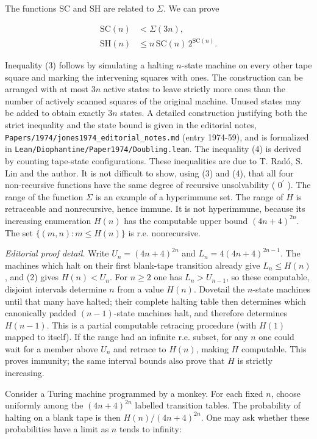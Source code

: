 \documentclass[11pt]{article}
\newcommand{\SH}{\mathrm{SH}}
\newcommand{\SC}{\mathrm{SC}}
\begin{document}
The functions $\SC$ and $\SH$ are related to $\Sigma$. We can prove

\begin{align}
\SC(n)&<\Sigma(3n), \tag{3}\\
\SH(n)&\leq n\,\SC(n)\,2^{\SC(n)}. \tag{4}
\end{align}

Inequality (3) follows by simulating a halting $n$-state machine on every other tape square and marking the intervening squares with ones. The construction can be arranged with at most $3n$ active states to leave strictly more ones than the number of actively scanned squares of the original machine. Unused states may be added to obtain exactly $3n$ states. A detailed construction justifying both the strict inequality and the state bound is given in the editorial notes, \texttt{Papers/1974/}\allowbreak\texttt{jones1974\_editorial\_notes.md} (entry 1974-59), and is formalized in \texttt{Lean/Diophantine/Paper1974/}\allowbreak\texttt{Doubling.lean}. The inequality (4) is derived by counting tape-state configurations. These inequalities are due to T. Radó, S. Lin and the author. It is not difficult to show, using (3) and (4), that all four non-recursive functions have the same degree of recursive unsolvability ( $0^{\prime}$ ). The range of the function $\Sigma$ is an example of a hyperimmune set. The range of $H$ is retraceable and nonrecursive, hence immune. It is not hyperimmune, because its increasing enumeration $H(n)$ has the computable upper bound $(4n+4)^{2n}$. The set $\{(m, n): m \leq H(n)\}$ is r.e. nonrecursive.

\noindent\textit{Editorial proof detail.} Write $U_n=(4n+4)^{2n}$ and $L_n=4(4n+4)^{2n-1}$. The machines which halt on their first blank-tape transition already give $L_n\leq H(n)$, and (2) gives $H(n)<U_n$. For $n\geq2$ one has $L_n>U_{n-1}$, so these computable, disjoint intervals determine $n$ from a value $H(n)$. Dovetail the $n$-state machines until that many have halted; their complete halting table then determines which canonically padded $(n-1)$-state machines halt, and therefore determines $H(n-1)$. This is a partial computable retracing procedure (with $H(1)$ mapped to itself). If the range had an infinite r.e. subset, for any $n$ one could wait for a member above $U_n$ and retrace to $H(n)$, making $H$ computable. This proves immunity; the same interval bounds also prove that $H$ is strictly increasing.

Consider a Turing machine programmed by a monkey. For each fixed $n$, choose uniformly among the $(4n+4)^{2n}$ labelled transition tables. The probability of halting on a blank tape is then $H(n)/(4n+4)^{2n}$. One may ask whether these probabilities have a limit as $n$ tends to infinity:
\end{document}
